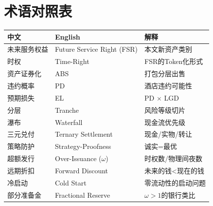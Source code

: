 \documentclass[12pt,a4paper]{ctexart}
\begin{document}
\section{术语对照表}
\begin{center}
\begin{tabular}{@{}lll@{}}
\toprule
中文 & English & 解释 \\
\midrule
未来服务权益 & Future Service Right (FSR) & 本文新资产类别 \\
时权 & Time-Right & FSR的Token化形式 \\
资产证券化 & ABS & 打包分层出售 \\
违约概率 & PD & 酒店违约可能性 \\
预期损失 & EL & PD × LGD \\
分层 & Tranche & 风险等级切片 \\
瀑布 & Waterfall & 现金流优先级 \\
三元兑付 & Ternary Settlement & 现金/实物/转让 \\
策略防护 & Strategy-Proofness & 诚实=最优 \\
超额发行 & Over-Issuance ($\omega$) & 时权数/物理间夜数 \\
远期折扣 & Forward Discount & 未来的钱<现在的钱 \\
冷启动 & Cold Start & 零流动性的启动问题 \\
部分准备金 & Fractional Reserve & $\omega>1$的银行类比 \\
\bottomrule
\end{tabular}
\end{center}

\vspace{1cm}
\begin{center}
\end{center}
\end{document}
